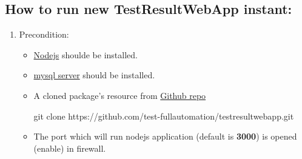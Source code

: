 \subsection{How to run new TestResultWebApp instant:}
\begin{enumerate}

\item Precondition:
\begin{itemize}
\item \href{https://nodejs.org/en/}{Nodejs} shoulde be installed.
\item \href{https://dev.mysql.com/downloads/mysql/}{mysql server} should be 
      installed.
\item A cloned package's resource from 
      \href{https://github.com/test-fullautomation/testresultwebapp}
      {Github repo}
\begin{robotlog}
git clone https://github.com/test-fullautomation/testresultwebapp.git
\end{robotlog}
\item The port which will run nodejs application (default is \textbf{3000}) is
      opened (enable) in firewall.

\end{itemize}


\end{enumerate}
